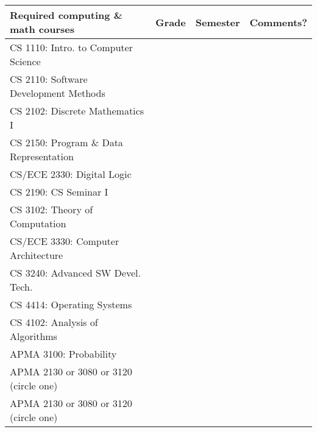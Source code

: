 \documentclass[10pt,letter]{book}
\begin{document}
\small 
\begin{tabular}{|l|l|l|l|} \hline
\bf Required computing \& math courses & \bf Grade & \bf Semester &
\bf Comments? \\ \hline \hline
CS 1110: Intro. to Computer Science & & & \\ \hline
CS 2110: Software Development Methods & & & \\ \hline
CS 2102: Discrete Mathematics I & & & \\ \hline
CS 2150: Program \& Data Representation & & & \\ \hline
CS/ECE 2330: Digital Logic & & & \\ \hline
CS 2190: CS Seminar I & & & \\ \hline
CS 3102: Theory of Computation & & & \\ \hline
CS/ECE 3330: Computer Architecture & & & \\ \hline
CS 3240: Advanced SW Devel. Tech. & & & \\ \hline
CS 4414: Operating Systems & & & \\ \hline
CS 4102: Analysis of Algorithms & & & \\ \hline
APMA 3100: Probability & & & \\ \hline
APMA 2130 or 3080 or 3120 (circle one) & & & \\ \hline
APMA 2130 or 3080 or 3120 (circle one) & & & \\ \hline
\end{tabular}
\end{document}
